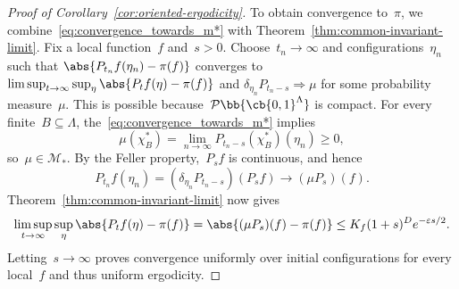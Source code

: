 \begin{proof}[Proof of Corollary~\ref{cor:oriented-ergodicity}]
To obtain convergence to~$\pi$, we combine~\eqref{eq:convergence_towards_m*}
with Theorem~\ref{thm:common-invariant-limit}.
Fix a local function~$f$ and~$s>0$. Choose~$t_n\to\infty$ and
configurations~$\eta_n$ such that
$\abs{P_{t_n}f(\eta_n)-\pi(f)}$ converges to
$\limsup_{t\to\infty}\sup_\eta\abs{P_tf(\eta)-\pi(f)}$ and
$\delta_{\eta_n}P_{t_n-s}\Rightarrow\mu$ for some probability measure~$\mu$. This is possible because~$\mathcal{P}\bb{\cb{0,1}^\Lambda}$ is compact.
For every finite~$B\subseteq\Lambda$, the~\eqref{eq:convergence_towards_m*} implies
\begin{equation*}
\mu(\chi_B^*)
=\lim_{n\to\infty}P_{t_n-s}(\chi_B^*)(\eta_n)\geq0,
\end{equation*}
so~$\mu\in\mathcal M_*$. By the Feller property,~$P_sf$ is continuous,
and hence
\begin{equation*}
P_{t_n}f(\eta_n)
=(\delta_{\eta_n}P_{t_n-s})(P_sf)
\longrightarrow(\mu P_s)(f).
\end{equation*}
Theorem~\ref{thm:common-invariant-limit} now gives
\begin{equation*}
\limsup_{t\to\infty}\sup_\eta\abs{P_tf(\eta)-\pi(f)}
=\abs{(\mu P_s)(f)-\pi(f)}
\leq K_f(1+s)^D e^{-\varepsilon s/2}.
\end{equation*}
Letting~$s\to\infty$ proves convergence uniformly over initial
configurations for every local~$f$ and thus uniform ergodicity.

\par
\end{proof}
